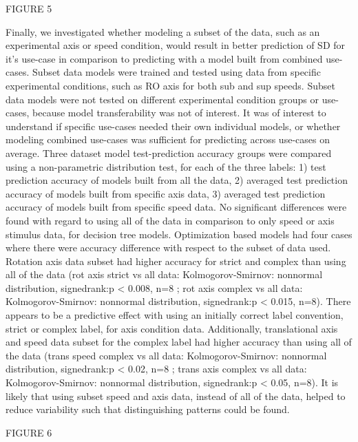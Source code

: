 \documentclass[11pt, onecolumn]{article}
\begin{document}
FIGURE 5

Finally, we investigated whether modeling a subset of the data, such as an experimental axis or speed condition, would result in better prediction of SD for it’s use-case in comparison to predicting with a model built from combined use-cases.  Subset data models were trained and tested using data from specific experimental conditions, such as RO axis for both sub and sup speeds.  Subset data models were not tested on different experimental condition groups or use-cases, because model transferability was not of interest.  It was of interest to understand if specific use-cases needed their own individual models, or whether modeling combined use-cases was sufficient for predicting across use-cases on average.  Three dataset model test-prediction accuracy groups were compared using a non-parametric distribution test, for each of the three labels:  1) test prediction accuracy of models built from all the data, 2) averaged test prediction accuracy of models built from specific axis data, 3) averaged test prediction accuracy of models built from specific speed data.  No significant differences were found with regard to using all of the data in comparison to only speed or axis stimulus data, for decision tree models.  Optimization based models had four cases where there were accuracy difference with respect to the subset of data used.  Rotation axis data subset had higher accuracy for strict and complex than using all of the data (rot axis strict vs all data: Kolmogorov-Smirnov: nonnormal distribution, signedrank:p < 0.008, n=8 ; rot axis complex vs all data: Kolmogorov-Smirnov: nonnormal distribution, signedrank:p < 0.015, n=8).  There appears to be a predictive effect with using an initially correct label convention, strict or complex label, for axis condition data. Additionally, translational axis and speed data subset for the complex label had higher accuracy than using all of the data (trans speed complex vs all data: Kolmogorov-Smirnov: nonnormal distribution, signedrank:p < 0.02, n=8 ; trans axis complex vs all data: Kolmogorov-Smirnov: nonnormal distribution, signedrank:p < 0.05, n=8).  It is likely that using subset speed and axis data, instead of all of the data, helped to reduce variability such that distinguishing patterns could be found.

FIGURE 6
\end{document}
